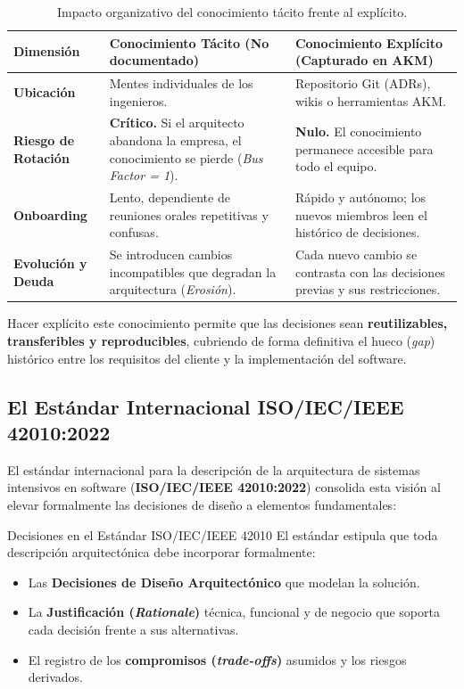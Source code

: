 \begin{table}[htbp]
\centering
\small
\begin{tabularx}{\textwidth}{l p{5.5cm} X}
\toprule
\textbf{Dimensión} & \textbf{Conocimiento Tácito (No documentado)} & \textbf{Conocimiento Explícito (Capturado en AKM)} \\
\midrule
\textbf{Ubicación} & Mentes individuales de los ingenieros. & Repositorio Git (ADRs), wikis o herramientas AKM. \\
\addlinespace
\textbf{Riesgo de Rotación} & \textbf{Crítico.} Si el arquitecto abandona la empresa, el conocimiento se pierde (\emph{Bus Factor = 1}). & \textbf{Nulo.} El conocimiento permanece accesible para todo el equipo. \\
\addlinespace
\textbf{Onboarding} & Lento, dependiente de reuniones orales repetitivas y confusas. & Rápido y autónomo; los nuevos miembros leen el histórico de decisiones. \\
\addlinespace
\textbf{Evolución y Deuda} & Se introducen cambios incompatibles que degradan la arquitectura (\emph{Erosión}). & Cada nuevo cambio se contrasta con las decisiones previas y sus restricciones. \\
\bottomrule
\end{tabularx}
\caption{Impacto organizativo del conocimiento tácito frente al explícito.}
\label{tab:tacito-explicito}
\end{table}

Hacer explícito este conocimiento permite que las decisiones sean \textbf{reutilizables, transferibles y reproducibles}, cubriendo de forma definitiva el hueco (\emph{gap}) histórico entre los requisitos del cliente y la implementación del software.

\subsection{El Estándar Internacional ISO/IEC/IEEE 42010:2022}

El estándar internacional para la descripción de la arquitectura de sistemas intensivos en software (\textbf{ISO/IEC/IEEE 42010:2022}) consolida esta visión al elevar formalmente las decisiones de diseño a elementos fundamentales:

\begin{definicion}{Decisiones en el Estándar ISO/IEC/IEEE 42010}
El estándar estipula que toda descripción arquitectónica debe incorporar formalmente:
\begin{itemize}[leftmargin=1.5em]
  \item Las \textbf{Decisiones de Diseño Arquitectónico} que modelan la solución.
  \item La \textbf{Justificación (\emph{Rationale})} técnica, funcional y de negocio que soporta cada decisión frente a sus alternativas.
  \item El registro de los \textbf{compromisos (\emph{trade-offs})} asumidos y los riesgos derivados.
\end{itemize}
\end{definicion}

